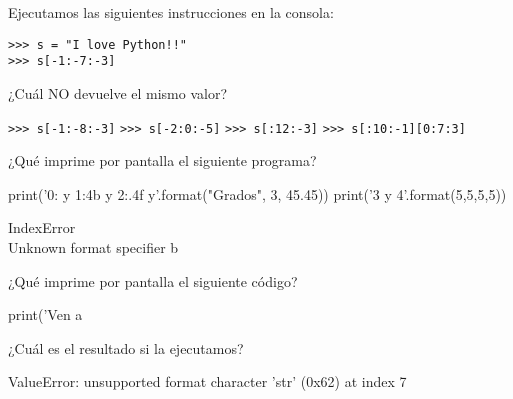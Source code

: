 \begin{ejercicio} 
Ejecutamos las siguientes instrucciones en la consola:
\begin{verbatim}
>>> s = "I love Python!!"
>>> s[-1:-7:-3]
\end{verbatim}

¿Cuál NO devuelve el mismo valor?

\begin{choices}
    \choice \verb|>>> s[-1:-8:-3]|
    \choice \verb|>>> s[-2:0:-5]|   %
    \choice \verb|>>> s[:12:-3]|
    \choice \verb|>>> s[:10:-1][0:7:3]|
\end{choices}
\end{ejercicio}


\begin{ejercicio} ¿Qué imprime por pantalla el siguiente programa?

\begin{python}
print('{0:} y {1:4b} y {2:.4f} y'.format("Grados", 3, 45.45))
print('{3} y {4}'.format(5,5,5,5))
\end{python}

\begin{choices}
    \choice  
{} $\;\;\;\;\;$\\   %
IndexError
    \choice 
{}\\
    \choice Unknown format specifier b
    \choice 
{} $\;\;\;\;\;$\\
\end{choices}

\end{ejercicio}


\begin{ejercicio} ¿Qué imprime por pantalla el siguiente código?

\begin{python}
print('Ven a %
\end{python}

¿Cuál es el resultado si la ejecutamos?

\begin{choices}
    \choice {}   %
    \choice {}
    \choice ValueError: unsupported format character 'str' (0x62) at index 7
    \choice {}
\end{choices}

\end{ejercicio}



